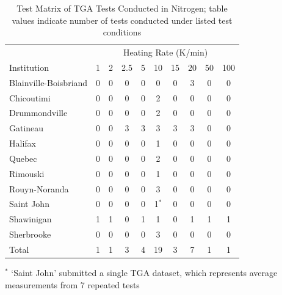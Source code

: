 \documentclass{book}
\begin{document}
\begin{table}[ht]
\caption{Test Matrix of TGA Tests Conducted in Nitrogen; table values indicate number of tests conducted under listed test conditions}
\label{Table:Matrix_TGA_N2}
\begin{center}
\begin{tabular}{lccccccccc}
\hline
                        & \multicolumn{9}{c}{Heating Rate (K/min)}                     \\ %
Institution             & 1     & 2   & 2.5 & 5   & 10    & 15  & 20  & 50  & 100      \\ \hline
Blainville-Boisbriand   &   0   & 0   & 0   & 0   & 0     & 0   & 3   & 0   & 0        \\
Chicoutimi              &   0   & 0   & 0   & 0   & 2     & 0   & 0   & 0   & 0        \\
Drummondville           &   0   & 0   & 0   & 0   & 2     & 0   & 0   & 0   & 0        \\
Gatineau                &   0   & 0   & 3   & 3   & 3     & 3   & 3   & 0   & 0        \\
Halifax                 &   0   & 0   & 0   & 0   & 1     & 0   & 0   & 0   & 0        \\
Quebec                  &   0   & 0   & 0   & 0   & 2     & 0   & 0   & 0   & 0        \\
Rimouski                &   0   & 0   & 0   & 0   & 1     & 0   & 0   & 0   & 0        \\
Rouyn-Noranda           &   0   & 0   & 0   & 0   & 3     & 0   & 0   & 0   & 0        \\
Saint John              &   0   & 0   & 0   & 0   & 1$^*$ & 0   & 0   & 0   & 0        \\
Shawinigan              &   1   & 1   & 0   & 1   & 1     & 0   & 1   & 1   & 1        \\
Sherbrooke              &   0   & 0   & 0   & 0   & 3     & 0   & 0   & 0   & 0        \\ \hline
Total                   &   1   & 1   & 3   & 4   & 19    & 3   & 7   & 1   & 1        \\ \hline
\end{tabular}
\end{center}
$^*$ `Saint John' submitted a single TGA dataset, which represents average measurements from 7 repeated tests
\end{table}
\end{document}

